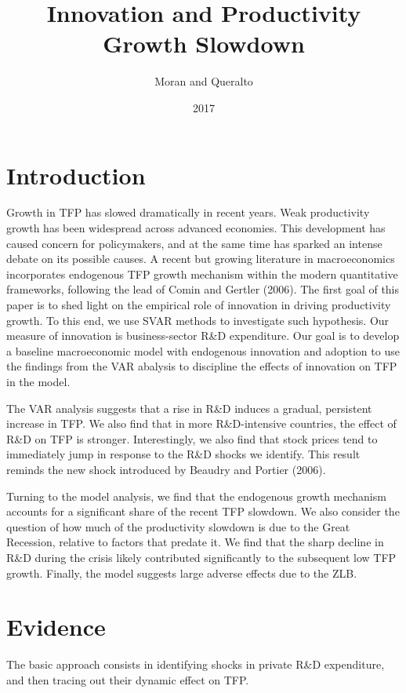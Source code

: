 \documentclass{article}
\title{Innovation and Productivity Growth Slowdown}
\author{Moran and Queralto}
\date{2017}
\begin{document}
\maketitle

\section{Introduction}

Growth in TFP has slowed dramatically in recent years. Weak productivity growth has been widespread across advanced economies. This development has caused concern for policymakers, and at the same time has sparked an intense debate on its possible causes. A recent but growing literature in macroeconomics incorporates endogenous TFP growth mechanism within the modern quantitative frameworks, following the lead of Comin and Gertler (2006). The first goal of this paper is to shed light on the empirical role of innovation in driving productivity growth. To this end, we use SVAR methods to investigate such hypothesis. Our measure of innovation is business-sector R\&D expenditure. Our goal is to develop a baseline macroeconomic model with endogenous innovation and adoption to use the findings from the VAR abalysis to discipline the effects of innovation on TFP in the model.

The VAR analysis suggests that a rise in R\&D induces a gradual, persistent increase in TFP. We also find that in more R\&D-intensive countries, the effect of R\&D on TFP is stronger. Interestingly, we also find that stock prices tend to immediately jump in response to the R\&D shocks we identify. This result reminds the new shock introduced by Beaudry and Portier (2006).

Turning to the model analysis, we find that the endogenous growth mechanism accounts for a significant share of the recent TFP slowdown. We also consider the question of how much of the productivity slowdown is due to the Great Recession, relative to factors that predate it. We find that the sharp decline in R\&D during the crisis likely contributed significantly to the subsequent low TFP growth. Finally, the model suggests large adverse effects due to the ZLB.

\section{Evidence}

The basic approach consists in identifying shocks in private R\&D expenditure, and then tracing out their dynamic effect on TFP.
\end{document}
